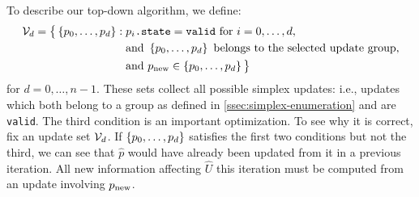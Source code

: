 \documentclass[eikonal.tex]{subfiles}
\begin{document}
To describe our top-down algorithm, we define:
\begin{equation}\label{eq:calU}
  \begin{aligned}
    \calV_d = \big\{\set{p_0, \hdots, p_d}: \; &p_i\texttt{.state}=\texttt{valid} \mbox{ for } i = 0, \hdots, d, \\
    &\mbox{and } \set{p_0, \hdots, p_d} \mbox{ belongs to the selected update group}, \\
    &\mbox{and } \pnew \in \set{p_0, \hdots, p_d} \big\}
  \end{aligned}
\end{equation}
for $d = 0, \hdots, n - 1$. These sets collect all possible simplex
updates: i.e., updates which both belong to a group as defined in
\cref{ssec:simplex-enumeration} and are \texttt{valid}. The third
condition is an important optimization. To see why it is correct, fix
an update set $\mathcal{V}_d$. If $\left\{p_0, \hdots, p_d\right\}$ satisfies the
first two conditions but not the third, we can see that $\hat{p}$
would have already been updated from it in a previous iteration. All
new information affecting $\hat{U}$ this iteration must be computed
from an update involving $p_{\operatorname{new}}$.
\end{document}
